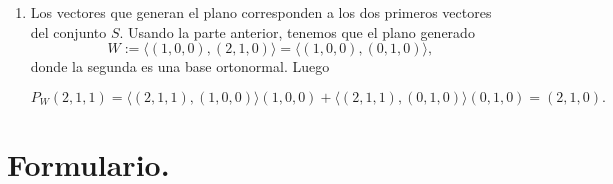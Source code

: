 \documentclass[a4paper]{article}
\theoremstyle{exampstyle}
\theoremstyle{definition}
\begin{document}
\begin{enumerate}
\begin{enumerate}
\begin{enumerate}
Luego 
\[w_2 = ( 2 , 1 , 0 ) - \dfrac{\langle ( 2 , 1 , 0 ),( 1 , 0 , 0 )\rangle}{\langle ( 1 , 0 , 0 ),( 1 , 0 , 0 )\rangle}( 1 , 0 , 0 )=( 2 , 1 , 0 ) - \dfrac{2}{1}( 1 , 0 , 0 )=( 0 , 1 , 0 )\]
\item Calculamos 
\[w_3=( 1 , 1 , 1 )-\dfrac{\langle ( 1 , 1 , 1 ),w_1\rangle}{\langle w_1,w_1\rangle}w_1-\dfrac{\langle ( 1 , 1 , 1 ),w_2\rangle}{\langle w_2,w_2\rangle}w_2=(0,0,1).\]
Obteniendo un conjunto ortonormal, pues corresponde a la base canónica.
\end{enumerate}
\item Los vectores que generan el plano corresponden a los dos primeros vectores del conjunto $S$. Usando la parte anterior, tenemos que el plano generado
\[W:=\langle (1,0,0), (2,1,0)\rangle=\langle (1,0,0), (0,1,0)\rangle,\]
donde la segunda es una base ortonormal. Luego

\[P_W(  2 , 1 , 1 ) = \langle ( 2 , 1 , 1 ) , (1,0,0)\rangle (1,0,0) + \langle ( 2 , 1 , 1 ) , (0,1,0)\rangle (0,1,0)=(2,1,0). \]
  \end{enumerate}
        









\end{enumerate}
\newpage
\section*{Formulario.}




\end{document}
